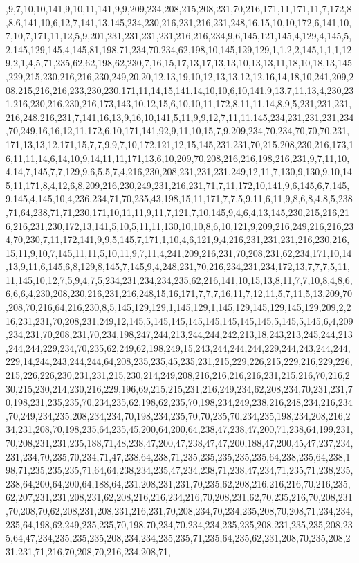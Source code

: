 ,9,7,10,10,141,9,10,11,141,9,9,209,234,208,215,208,231,70,216,171,11,171,11,7,172,8,8,6,141,10,6,12,7,141,13,145,234,230,216,231,216,231,248,16,15,10,10,172,6,141,10,7,10,7,171,11,12,5,9,201,231,231,231,231,216,216,234,9,6,145,121,145,4,129,4,145,5,2,145,129,145,4,145,81,198,71,234,70,234,62,198,10,145,129,129,1,1,2,2,145,1,1,1,129,2,1,4,5,71,235,62,62,198,62,230,7,16,15,17,13,17,13,13,10,13,13,11,18,10,18,13,145,229,215,230,216,216,230,249,20,20,12,13,19,10,12,13,13,12,12,16,14,18,10,241,209,208,215,216,216,233,230,230,171,11,14,15,141,14,10,10,6,10,141,9,13,7,11,13,4,230,231,216,230,216,230,216,173,143,10,12,15,6,10,10,11,172,8,11,11,14,8,9,5,231,231,231,216,248,216,231,7,141,16,13,9,16,10,141,5,11,9,9,12,7,11,11,145,234,231,231,231,234,70,249,16,16,12,11,172,6,10,171,141,92,9,11,10,15,7,9,209,234,70,234,70,70,70,231,171,13,13,12,171,15,7,7,9,9,7,10,172,121,12,15,145,231,231,70,215,208,230,216,173,16,11,11,14,6,14,10,9,14,11,11,171,13,6,10,209,70,208,216,216,198,216,231,9,7,11,10,4,14,7,145,7,7,129,9,6,5,5,7,4,216,230,208,231,231,231,249,12,11,7,130,9,130,9,10,145,11,171,8,4,12,6,8,209,216,230,249,231,216,231,71,7,11,172,10,141,9,6,145,6,7,145,9,145,4,145,10,4,236,234,71,70,235,43,198,15,11,171,7,7,5,9,11,6,11,9,8,6,8,4,8,5,238,71,64,238,71,71,230,171,10,11,11,9,11,7,121,7,10,145,9,4,6,4,13,145,230,215,216,216,216,231,230,172,13,141,5,10,5,11,11,130,10,10,8,6,10,121,9,209,216,249,216,216,234,70,230,7,11,172,141,9,9,5,145,7,171,1,10,4,6,121,9,4,216,231,231,231,216,230,216,15,11,9,10,7,145,11,11,5,10,11,9,7,11,4,241,209,216,231,70,208,231,62,234,171,10,14,13,9,11,6,145,6,8,129,8,145,7,145,9,4,248,231,70,216,234,231,234,172,13,7,7,7,5,11,11,145,10,12,7,5,9,4,7,5,234,231,234,234,235,62,216,141,10,15,13,8,11,7,7,10,8,4,8,6,6,6,6,4,230,208,230,216,231,216,248,15,16,171,7,7,7,16,11,7,12,11,5,7,11,5,13,209,70,208,70,216,64,216,230,8,5,145,129,129,1,145,129,1,145,129,145,129,145,129,209,2,216,231,231,70,208,231,249,12,145,5,145,145,145,145,145,145,145,5,145,5,145,6,4,209,234,231,70,208,231,70,234,198,247,244,213,244,244,242,213,18,243,213,245,244,213,244,244,229,234,70,235,62,249,62,198,249,15,243,244,244,244,229,244,243,244,244,229,14,244,243,244,244,64,208,235,235,45,235,231,215,229,226,215,229,216,229,226,215,226,226,230,231,231,215,230,214,249,208,216,216,216,216,231,215,216,70,216,230,215,230,214,230,216,229,196,69,215,215,231,216,249,234,62,208,234,70,231,231,70,198,231,235,235,70,234,235,62,198,62,235,70,198,234,249,238,216,248,234,216,234,70,249,234,235,208,234,234,70,198,234,235,70,70,235,70,234,235,198,234,208,216,234,231,208,70,198,235,64,235,45,200,64,200,64,238,47,238,47,200,71,238,64,199,231,70,208,231,231,235,188,71,48,238,47,200,47,238,47,47,200,188,47,200,45,47,237,234,231,234,70,235,70,234,71,47,238,64,238,71,235,235,235,235,235,64,238,235,64,238,198,71,235,235,235,71,64,64,238,234,235,47,234,238,71,238,47,234,71,235,71,238,235,238,64,200,64,200,64,188,64,231,208,231,231,70,235,62,208,216,216,216,70,216,235,62,207,231,231,208,231,62,208,216,216,234,216,70,208,231,62,70,235,216,70,208,231,70,208,70,62,208,231,208,231,216,231,70,208,234,70,234,235,208,70,208,71,234,234,235,64,198,62,249,235,235,70,198,70,234,70,234,234,235,235,208,231,235,235,208,235,64,47,234,235,235,235,208,234,234,235,235,71,235,64,235,62,231,208,70,235,208,231,231,71,216,70,208,70,216,234,208,71,